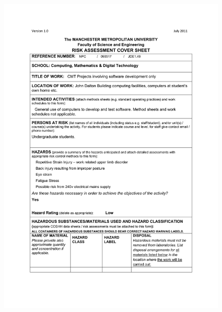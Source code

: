 \documentclass[a4paper,12pt]{report}
\begin{document}
\begin{appendices}
    \begin{figure}[h]
      \centering
      \includegraphics[scale=0.8]{risk-assessment-1}
    \end{figure}


\end{appendices}
\end{document}
